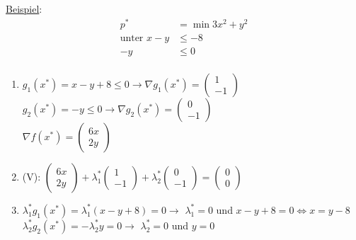\underline{Beispiel}:
\begin{align*}
    p^* &= \min 3x^2 + y^2\\
    \text{unter } x - y &\leq -8\\
    -y &\leq 0\\
\end{align*}

\begin{enumerate}
    \item \(g_1(x^*)=x-y+8 \leq 0 \rightarrow \nabla g_1(x^*) = \begin{pmatrix}
        1\\-1
    \end{pmatrix}\)\\
    \(g_2(x^*)=-y \leq 0 \rightarrow \nabla g_2(x^*) = \begin{pmatrix}
        0\\-1
    \end{pmatrix}\)\\
    \(\nabla f(x^*) = \begin{pmatrix}
        6x\\2y
    \end{pmatrix}\)\\

    \item (V): \(\begin{pmatrix}
        6x\\2y
    \end{pmatrix} + \lambda_1^* \begin{pmatrix}
        1\\-1
    \end{pmatrix} + \lambda_2^* \begin{pmatrix}
        0\\-1
    \end{pmatrix} = \begin{pmatrix}
        0\\0
    \end{pmatrix}\)\\

    \item \(\lambda_1^* g_1(x^*) = \lambda_1^*(x-y+8)=0 \rightarrow\) \underline{\(\lambda_1^*=0\)} und \(x-y+8=0 \Leftrightarrow \)\underline{\(x = y-8\)}\\
          \(\lambda_2^* g_2(x^*) = -\lambda_2^* y = 0 \rightarrow\) \underline{\(\lambda_2^*=0\)} und \underline{\(y=0\)}\\
    

\end{enumerate}
